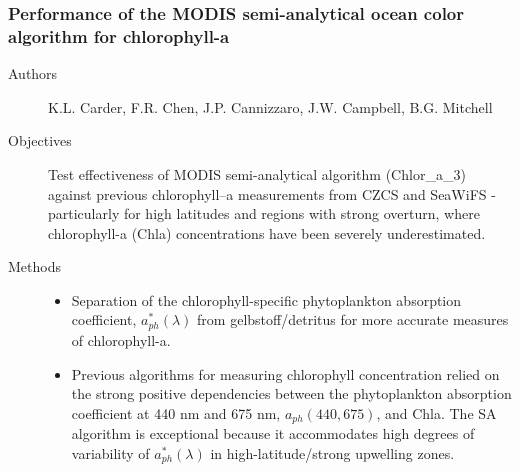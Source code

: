 \begin{frame}\frametitle{Performance of the MODIS semi-analytical ocean color algorithm for chlorophyll-a} 
\scriptsize
\begin{description}
    \item[Authors] K.L. Carder, F.R. Chen, J.P. Cannizzaro, J.W. Campbell, B.G. Mitchell
    \item[Objectives] Test effectiveness of MODIS semi-analytical algorithm (Chlor\_a\_3) against previous chlorophyll--a measurements from CZCS and SeaWiFS - particularly for high latitudes and regions with strong overturn, where chlorophyll-a (Chla) concentrations have been severely underestimated.
    
    \item[Methods] 
        \begin{itemize}
            \item Separation of the chlorophyll-specific phytoplankton absorption coefficient, $a^{\ast}_{ph}(\lambda)$ from gelbstoff/detritus for more accurate measures of chlorophyll-a.
            \item Previous algorithms for measuring chlorophyll concentration relied on the strong positive dependencies between the phytoplankton absorption coefficient at 440 nm and 675 nm, $a_{ph}(440, 675)$, and Chla. The SA algorithm is exceptional because it accommodates high degrees of variability of $a^{\ast}_{ph}(\lambda)$ in high-latitude/strong upwelling zones.
        \end{itemize}
\end{description}
\end{frame}

